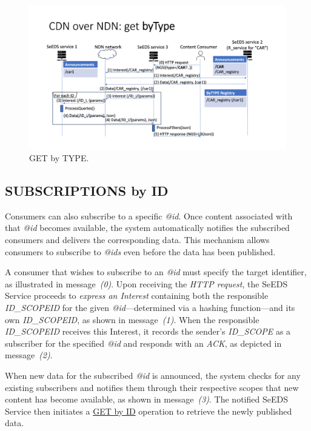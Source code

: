 \documentclass{article}
\begin{document}
\begin{figure}[H]
    \centering
    \includegraphics[width=0.8\linewidth]{images/get_by_type.png}
    \caption{GET by TYPE.}
    \label{fig:get_by_type}
\end{figure}

\pagebreak

\subsection{SUBSCRIPTIONS by ID}\label{subscriptions_by_id_section}

Consumers can also subscribe to a specific \textit{@id}. Once content associated with that \textit{@id} becomes available, the system automatically notifies the subscribed consumers and delivers the corresponding data. This mechanism allows consumers to subscribe to \textit{@ids} even before the data has been published. 

A consumer that wishes to subscribe to an \textit{@id} must specify the target identifier, as illustrated in message~\emph{(0)}. Upon receiving the \emph{HTTP request}, the SeEDS Service proceeds to \emph{express an Interest} containing both the responsible \emph{ID\_SCOPEID} for the given \textit{@id}—determined via a hashing function—and its own \emph{ID\_SCOPEID}, as shown in message~\emph{(1)}. When the responsible \emph{ID\_SCOPEID} receives this Interest, it records the sender’s \emph{ID\_SCOPE} as a subscriber for the specified \textit{@id} and responds with an \emph{ACK}, as depicted in message~\emph{(2)}.

When new data for the subscribed \textit{@id} is announced, the system checks for any existing subscribers and notifies them through their respective scopes that new content has become available, as shown in message~\emph{(3)}. The notified SeEDS Service then initiates a \hyperref[get_by_id_section]{GET by ID} operation to retrieve the newly published data.
\end{document}
